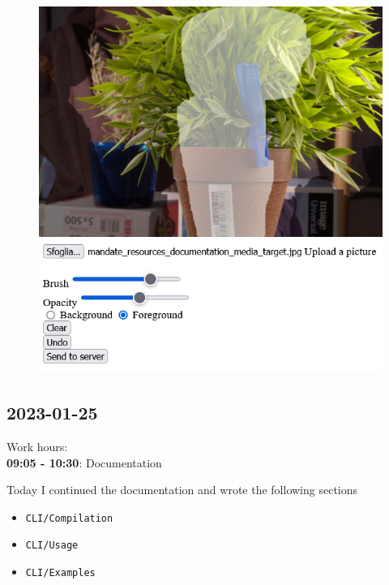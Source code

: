 \documentclass{article}
\begin{document}
\begin{figure}[h]
    \begin{minipage}{0.5\textwidth}
        \includegraphics[width=\textwidth]{painting1.png}
    \end{minipage}
    \begin{minipage}{0.5\textwidth}
        \includegraphics[width=\textwidth]{painting2.png}
    \end{minipage}
\end{figure}

\subsection{2023-01-25}

Work hours:\\
\textbf{09:05 - 10:30}: Documentation

Today I continued the documentation and wrote the following sections
\begin{itemize}
    \item \texttt{CLI/Compilation}
    \item \texttt{CLI/Usage}
    \item \texttt{CLI/Examples}
\end{itemize}
\end{document}
